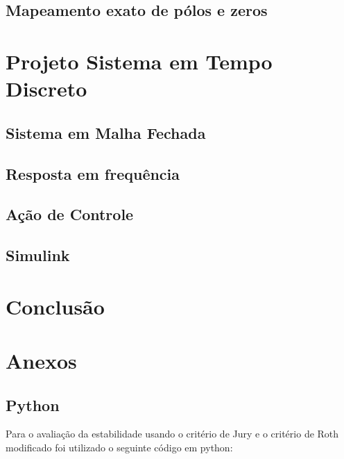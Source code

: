 \documentclass[a4paper,11pt]{article}
\begin{document}
\subsection{Mapeamento exato de pólos e zeros}


\section{Projeto Sistema em Tempo Discreto}
\subsection{Sistema em Malha Fechada}
\subsection{Resposta em frequência}
\subsection{Ação de Controle}
\subsection{Simulink}
\subsection{}

\section{Conclusão}


\nocite{sympy}



\section{Anexos}
\subsection{Python}

Para o avaliação da estabilidade usando o critério de Jury e o critério de Roth modificado foi utilizado o seguinte código em python:
\end{document}
